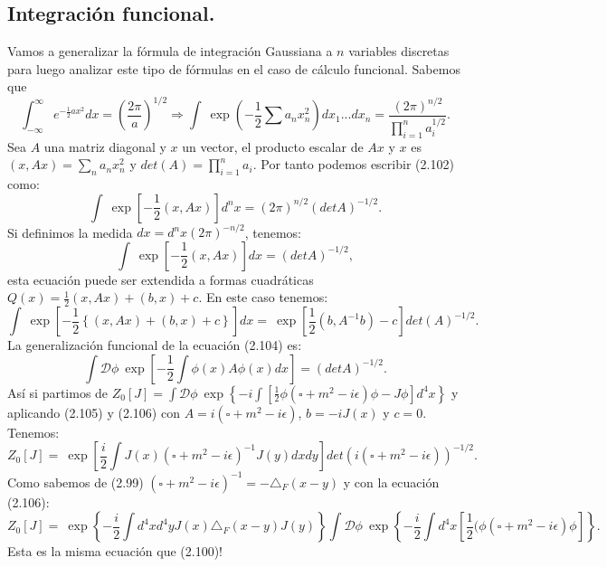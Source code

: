\subsection{Integración funcional.}
Vamos a generalizar la fórmula de integración Gaussiana a $n$ variables discretas para luego analizar este tipo de fórmulas en el caso de cálculo funcional. Sabemos que 
\begin{equation}
\int_{-\infty}^{\infty}e^{-\frac{1}{2}ax^{2}}dx=\left(\frac{2\pi}{a}\right)^{1/2}\Rightarrow\int\ \exp\left(-\frac{1}{2}\sum a_{n}x_{n}^{2}\right)dx_{1}...dx_{n}=\frac{(2\pi)^{n/2}}{\prod_{i=1}^{n}a_{i}^{1/2}} .
\end{equation}
Sea $A$ una matriz diagonal y $x$ un vector, el producto escalar de $Ax$ y $x$ es $(x,Ax)=\sum_n a_nx_{n}^{2}$ y $det(A)=\prod_{i=1}^{n}a_i$. Por tanto podemos escribir (2.102) como:
\begin{equation}
\int\ \exp\left[-\frac{1}{2}(x,Ax)\right]d^{n}x=(2\pi)^{n/2}(detA)^{-1/2} .
\end{equation}
Si definimos la medida $dx=d^nx(2\pi)^{-n/2}$, tenemos:
\begin{equation}
\int\ \exp\left[-\frac{1}{2}(x,Ax)\right]dx=(detA)^{-1/2} ,
\end{equation}
esta ecuación puede ser extendida a formas cuadráticas $Q(x)=\frac{1}{2}(x,Ax)+(b,x)+c$. En este caso tenemos:
\begin{equation}
\int\ \exp\left[-\frac{1}{2}\left\{ (x,Ax)+(b,x)+c\right\} \right]dx=\ \exp\left[\frac{1}{2}(b,A^{-1}b)-c\right]det(A)^{-1/2} .
\end{equation}
La generalización funcional de la ecuación (2.104) es:
\begin{equation}
\int\mathcal{D}\phi\ \exp\left[-\frac{1}{2}\int\phi(x)A\phi(x)dx\right]=(detA)^{-1/2} .
\end{equation}
Así si partimos de $Z_{0}[J]=\int\mathcal{D}\phi\ \exp\left\{ -i\int\left[\frac{1}{2}\phi(\square+m^{2}-i\epsilon)\phi-J\phi\right]d^{4}x\right\} $ y aplicando (2.105) y (2.106) con $A=i(\square+m^2-i\epsilon)$, $b=-iJ(x)$ y $c=0$. Tenemos:
\begin{equation}
Z_{0}[J]=\ \exp\left[\frac{i}{2}\int J(x)(\square+m^{2}-i\epsilon)^{-1}J(y)dxdy\right]det(i(\square+m^{2}-i\epsilon))^{-1/2} .
\end{equation}
Como sabemos  de (2.99) $(\square +m^2-i\epsilon)^{-1}=-\triangle_F(x-y)$ y con la ecuación (2.106):
\begin{equation}
Z_0[J]=\ \exp\left\{ -\frac{i}{2}\int d^{4}xd^{4}yJ(x)\triangle_{F}(x-y)J(y)\right\} \int\mathcal{D}\phi\ \exp\left\{ -\frac{i}{2}\int d^{4}x\left[\frac{1}{2}(\phi(\square +m^{2}-i\epsilon)\phi\right]\right\} . 
\end{equation}
Esta es la misma ecuación que (2.100)!

